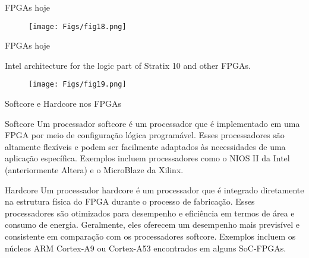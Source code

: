 \documentclass[aspectratio=169]{beamer}
\begin{document}
\begin{frame}{FPGAs hoje}
	\justifying

	\begin{figure}[h]
		\centering
		\texttt{[image: Figs/fig18.png]}
	\end{figure}	
	
\end{frame}

\begin{frame}{FPGAs hoje}
	\justifying
	
	Intel architecture for the logic part of Stratix 10 and other FPGAs.
	
	\begin{figure}[h]
		\centering
		\texttt{[image: Figs/fig19.png]}
	\end{figure}	
	
\end{frame}

\begin{frame}{Softcore e Hardcore nos FPGAs}
	\justifying
	
	\begin{block}{Softcore}
		\justifying
		Um processador softcore é um processador que é implementado em uma FPGA por meio de configuração lógica programável. Esses processadores são altamente flexíveis e podem ser facilmente adaptados às necessidades de uma aplicação específica. Exemplos incluem processadores como o NIOS II da Intel (anteriormente Altera) e o MicroBlaze da Xilinx.
		
	\end{block}	
	
	
	\begin{block}{Hardcore}
	\justifying
	Um processador hardcore é um processador que é integrado diretamente na estrutura física do FPGA durante o processo de fabricação. Esses processadores são otimizados para desempenho e eficiência em termos de área e consumo de energia. Geralmente, eles oferecem um desempenho mais previsível e consistente em comparação com os processadores softcore. Exemplos incluem os núcleos ARM Cortex-A9 ou Cortex-A53 encontrados em alguns SoC-FPGAs.
	
	\end{block}		
	
	
\end{frame}
\end{document}
